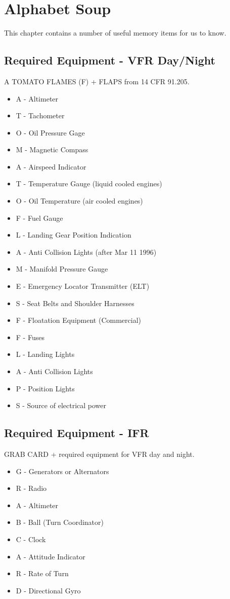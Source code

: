 \chapter{Alphabet Soup}

This chapter contains a number of useful memory items for us to know.

\section{Required Equipment - VFR Day/Night}

A TOMATO FLAMES (F) + FLAPS from 14 CFR 91.205.

\begin{itemize}
\item A - Altimeter
\item T - Tachometer
\item O - Oil Pressure Gage
\item M - Magnetic Compass
\item A - Airspeed Indicator
\item T - Temperature Gauge (liquid cooled engines)
\item O - Oil Temperature (air cooled engines)
\item F - Fuel Gauge
\item L - Landing Gear Position Indication
\item A - Anti Collision Lights (after Mar 11 1996)
\item M - Manifold Pressure Gauge
\item E - Emergency Locator Transmitter (ELT)
\item S - Seat Belts and Shoulder Harnesses
\item F - Floatation Equipment (Commercial)
\item F - Fuses
\item L - Landing Lights
\item A - Anti Collision Lights
\item P - Position Lights
\item S - Source of electrical power
\end{itemize}

\section{Required Equipment - IFR}

GRAB CARD + required equipment for VFR day and night.

\begin{itemize}
\item G - Generators or Alternators
\item R - Radio
\item A - Altimeter
\item B - Ball (Turn Coordinator)
\item C - Clock
\item A - Attitude Indicator
\item R - Rate of Turn
\item D - Directional Gyro
\end{itemize}

